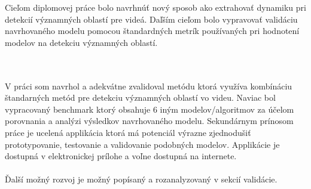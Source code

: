 Cieľom diplomovej práce bolo navrhnúť nový sposob ako extrahovať dynamiku pri detekcií významných oblastí pre videá.
Daľším cieľom bolo vypravovať validáciu navrhovaného modelu pomocou štandardných metrík používaných pri hodnotení modelov na detekciu významných oblastí.

\\\\
V práci som navrhol a adekvátne zvalidoval metódu ktorá využíva kombínáciu štandarných metód pre detekciu významných oblastí vo videu.
Naviac bol vypracovaný benchmark ktorý obsahuje 6 iným modelov/algoritmov za účelom porovnania a analýzi výsledkov navrhovaného modelu.
Sekundárnym prínosom práce je ucelená applikácia ktorá má potenciál výrazne zjednodušiť prototypovanie, testovanie a validovanie podobných modelov.
Applikácie je dostupná v elektronickej prílohe a voľne dostupná na internete.
\\\\
Ďalší možný rozvoj je možný popísaný a rozanalyzovaný v sekcií validácie.
